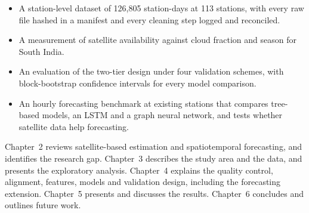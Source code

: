 \begin{itemize}
  \item A station-level dataset of 126,805 station-days at 113 stations, with every raw file
        hashed in a manifest and every cleaning step logged and reconciled.
  \item A measurement of satellite availability against cloud fraction and season for South India.
  \item An evaluation of the two-tier design under four validation schemes, with block-bootstrap
        confidence intervals for every model comparison.
  \item An hourly forecasting benchmark at existing stations that compares tree-based models,
        an LSTM and a graph neural network, and tests whether satellite data help forecasting.
\end{itemize}

Chapter~2 reviews satellite-based \pmtf{} estimation and spatiotemporal forecasting, and identifies
the research gap. Chapter~3 describes the study area and the data, and presents the exploratory
analysis. Chapter~4 explains the quality control, alignment, features, models and validation
design, including the forecasting extension. Chapter~5 presents and discusses the results.
Chapter~6 concludes and outlines future work.

